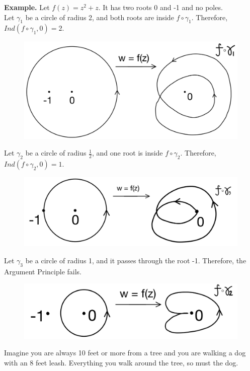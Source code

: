 \documentclass[11pt]{article}
\begin{document}
\textbf{Example.} Let $f(z) = z^2 + z$. It has two roots 0 and -1 and no poles. \\
Let $\gamma_1$ be a circle of radius 2, and both roots are inside $f \circ \gamma_1$. Therefore, $Ind(f \circ \gamma_1, 0) = 2$. \\
\begin{figure}[H]
\includegraphics[scale = 0.14]{22_8}
\centering
\end{figure}
Let $\gamma_2$ be a circle of radius $\frac{1}{2}$, and one root is inside $f \circ \gamma_2$. Therefore, $Ind(f \circ \gamma_2, 0) = 1$. \\ 
\begin{figure}[H]
\includegraphics[scale = 0.2]{22_9}
\centering
\end{figure}
Let $\gamma_3$ be a circle of radius 1, and it passes through the root -1. Therefore, the Argument Principle fails. \\ 
\begin{figure}[H]
\includegraphics[scale = 0.2]{22_10}
\centering
\end{figure}
Imagine you are always 10 feet or more from a tree and you are walking a dog with an 8 feet leash. Everything you walk around the tree, so must the dog. \\ 
\end{document}
